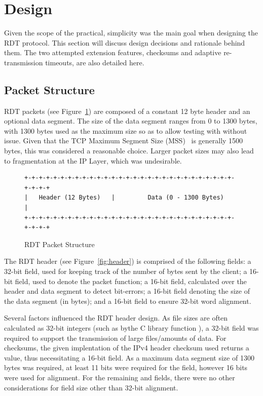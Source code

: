 \section{Design}

Given the scope of the practical, simplicity was the main goal when designing the RDT protocol. This section will discuss design decisions and rationale behind them. The two attempted extension features, checksums and adaptive re-transmission timeouts,  are also detailed here.

\subsection{Packet Structure}

RDT packets (see Figure~\ref{fig:packet}) are composed of a constant 12 byte header and an optional data segment. The size of the data segment ranges from 0 to 1300 bytes, with 1300 bytes used as the maximum size so as to allow testing with  without issue. Given that the TCP Maximum Segment Size (MSS)~\cite{rfc793} is generally 1500 bytes, this was considered a reasonable choice. Larger packet sizes may also lead to fragmentation at the IP Layer, which was undesirable.

\begin{figure}[h]
\begin{verbatim}
+-+-+-+-+-+-+-+-+-+-+-+-+-+-+-+-+-+-+-+-+-+-+-+-+-+-+-+-+-+-+-+-+
|   Header (12 Bytes)   |         Data (0 - 1300 Bytes)         |
+-+-+-+-+-+-+-+-+-+-+-+-+-+-+-+-+-+-+-+-+-+-+-+-+-+-+-+-+-+-+-+-+
\end{verbatim}
\caption{RDT Packet Structure}\label{fig:packet}
\end{figure}

The RDT header (see Figure~\ref{fig:header}) is comprised of the following fields: a 32-bit  field, used for keeping track of the number of bytes sent by the client; a 16-bit  field, used to denote the packet function; a 16-bit  field, calculated over the header and data segment to detect bit-errors; a 16-bit  field denoting the size of the data segment (in bytes); and a 16-bit  field to ensure 32-bit word alignment.

Several factors influenced the RDT header design. As file sizes are often calculated as 32-bit integers (such as bythe C library function ), a 32-bit  field was required to support the transmission of large files/amounts of data. For checksums, the given implentation of the IPv4 header checksum used returns a  value, thus necessitating a 16-bit field. As a maximum data segment size of 1300 bytes was required, at least 11 bits were required for the  field, however 16 bits were used for alignment. For the remaining  and  fields, there were no other considerations for field size other than 32-bit alignment. 

